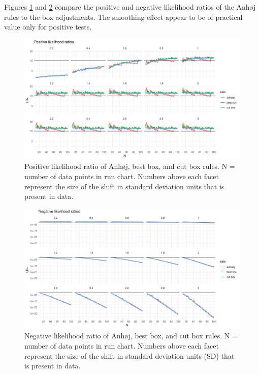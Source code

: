 Figures \ref{figure:lrpos} and \ref{figure:lrneg} compare the positive
and negative likelihood ratios of the Anhøj rules to the box
adjustments. The smoothing effect appear to be of practical value only
for positive tests.

\begin{figure}[htbp]
  \centering
  \includegraphics[width=\textwidth]{fig_lrpos.pdf}
  \caption{Positive likelihood ratio of Anhøj, best box, and cut box rules.
           N = number of data points in run chart.
           Numbers above each facet represent the size of the shift in standard
           deviation units that is present in data.}
  \label{figure:lrpos}
\end{figure}

\begin{figure}[htbp]
  \centering
  \includegraphics[width=\textwidth]{fig_lrneg.pdf}
  \caption{Negative likelihood ratio of Anhøj, best box, and cut box rules.
           N = number of data points in run chart.
           Numbers above each facet represent the size of the shift in standard
           deviation units (SD) that is present in data.}
  \label{figure:lrneg}
\end{figure}

